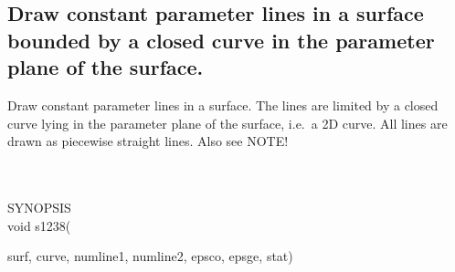 \subsection{Draw constant parameter lines in a
surface bounded by a closed curve in the parameter plane of the surface.}
\begin{minipg1}
  Draw constant parameter lines in a surface. The lines are limited by a closed
  curve lying in the parameter plane of the surface, i.e.\ a 2D curve.
  All lines are drawn as piecewise straight lines. Also see NOTE!
\end{minipg1} \\ \\
SYNOPSIS\\
        \>void s1238(\begin{minipg3}
                {\fov surf}, {\fov curve}, {\fov numline1}, {\fov numline2}, {\fov epsco}, {\fov epsge}, {\fov stat})
                \end{minipg3}\\[0.3ex]

